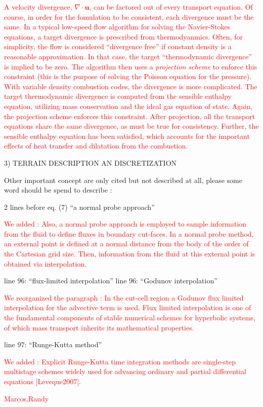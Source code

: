 \documentclass[12pt]{article}
\newcommand\hl[1]{\textcolor{red}{#1}}
\begin{document}
\hl{A velocity divergence, $\nabla\cdot\mathbf{u}$, can be factored out of every transport equation.  Of course, in order for the fomulation to be consistent, each divergence must be the same.  In a typical low-speed flow algorithm for solving the Navier-Stokes equations, a target divergence is prescribed from thermodyanmics.  Often, for simplicity, the flow is considered ``divergence free'' if constant density is a reasonable approximation.  In that case, the target ``thermodynamic divergence'' is implied to be zero. The algorithm then uses a \emph{projection scheme} to enforce this constraint (this is the purpose of solving the Poisson equation for the pressure). With variable density combustion codes, the divergence is more complicated.  The target thermodynamic divergence is computed from the sensible enthalpy equation, utilizing mass conservation and the ideal gas equation of state. Again, the projection scheme enforces this constraint.  After projection, all the transport equations share the same divergence, as must be true for consistency.  Further, the sensible enthalpy equation has been satisfied, which accounts for the important effects of heat transfer and dilatation from the combustion.}

3) TERRAIN DESCRIPTION AN DISCRETIZATION

Other important concept are only cited but not described at all, please some word should be spend to describe :

2 lines before eq. (7) ``a normal probe approach''

\hl{We added : Also, a normal probe approach is employed to sample information from the fluid to define fluxes in boundary cut-faces. In a normal probe method, an external point is defined at a normal distance from the body of the order of the Cartesian grid size. Then, information from the fluid at this external point is obtained via interpolation. }

line 96: ``flux-limited interpolation'' 
line 96: ``Godunov interpolation'' 

\hl{We reorganized the paragraph : In the cut-cell region a Godunov flux limited interpolation for the advective term is used. Flux limited interpolation is one of the fundamental components of stable numerical schemes for hyperbolic systems, of which mass transport inherits its mathematical properties.}

line 97: ``Runge-Kutta method'' 

\hl{We added : Explicit Runge-Kutta time integration methods are single-step multistage schemes widely used for advancing ordinary and partial differential equations [Leveque2007].}

\hl{Marcos,Randy}
\end{document}
